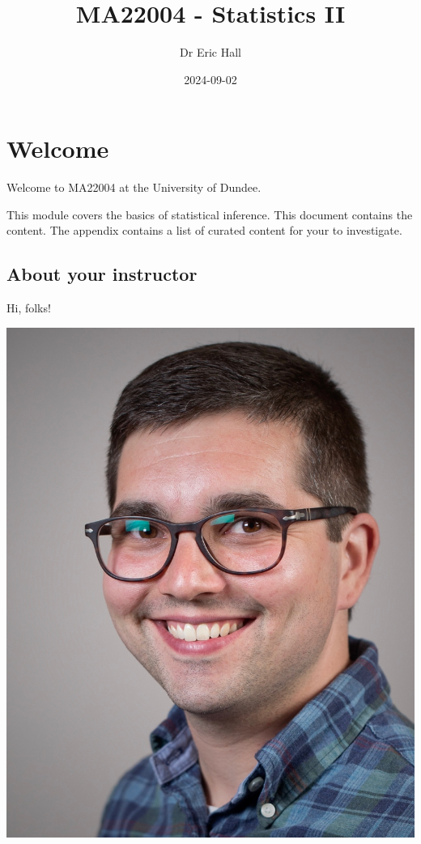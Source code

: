 \documentclass[
  a4paper,
  oneside]{book}
\title{MA22004 - Statistics II}
\author{Dr Eric Hall}
\date{2024-09-02}
\renewcommand*\contentsname{Table of contents}
\newcommand\contentsname{Table of contents}
\theoremstyle{definition}
\theoremstyle{definition}
\theoremstyle{definition}
\theoremstyle{plain}
\theoremstyle{remark}
\begin{document}
\frontmatter
\maketitle

\renewcommand*\contentsname{Table of contents}
{
\setcounter{tocdepth}{2}
\tableofcontents
}
\mainmatter
\chapter*{Welcome}\label{welcome}


Welcome to MA22004 at the University of Dundee.

This module covers the basics of statistical inference. This document
contains the content. The appendix contains a list of curated content
for your to investigate.

\section*{About your instructor}\label{about-your-instructor}


Hi, folks!

\includegraphics{assets/images/Eric_Hall_small.jpg}
\end{document}
